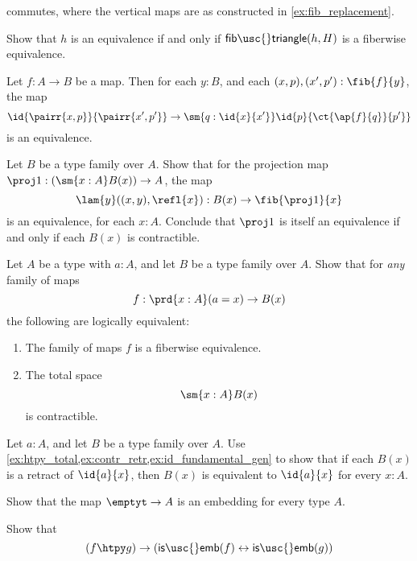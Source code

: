 \begin{exercises}
\begin{subexenum}
\begin{equation*}
\end{equation*}
commutes, where the vertical maps are as constructed in \cref{ex:fib_replacement}.
\item Show that $h$ is an equivalence if and only if $\mathsf{fib\usc{}triangle}(h,H)$ is a fiberwise equivalence.
\end{subexenum}
\item Let $f:A\to B$ be a map. Then for each $y:B$, and each $(x,p),(x',p'):\fib{f}{y}$, the map
\begin{equation*}
\id{\pairr{x,p}}{\pairr{x',p'}}\to \sm{q:\id{x}{x'}} \id{p}{\ct{\ap{f}{q}}{p'}}
\end{equation*}
is an equivalence. 
\item \label{ex:proj_fiber}Let $B$ be a type family over $A$. Show that for the projection map
$\proj 1 : (\sm{x:A}B(x))\to A$, the map
\begin{equation*}
\lam{y}((x,y),\refl{x}) : B(x)\to \fib{\proj 1}{x}
\end{equation*}
is an equivalence, for each $x:A$. Conclude that $\proj 1$ is itself an equivalence if and only if each $B(x)$ is contractible.
\item \label{ex:id_fundamental_gen}Let $A$ be a type with $a:A$, and let $B$ be a type family over $A$. Show that for \emph{any} family of maps
\begin{equation*}
f:\prd{x:A} (a=x)\to B(x)
\end{equation*}
the following are logically equivalent:
\begin{enumerate}
\item The family of maps $f$ is a fiberwise equivalence.
\item The total space
\begin{equation*}
\sm{x:A}B(x)
\end{equation*}
is contractible.
\end{enumerate}
\item \label{ex:id_fundamental_retr}Let $a:A$, and let $B$ be a type family over $A$. Use \autoref{ex:htpy_total,ex:contr_retr,ex:id_fundamental_gen} to show that if each $B(x)$ is a retract of $\id{a}{x}$, then $B(x)$ is equivalent to $\id{a}{x}$ for every $x:A$.
\item Show that the map $\emptyt\to A$ is an embedding for every type $A$.
\item Show that 
\begin{equation*}
(f\htpy g)\to (\mathsf{is\usc{}emb}(f)\leftrightarrow\mathsf{is\usc{}emb}(g))
\end{equation*}

\end{exercises}
